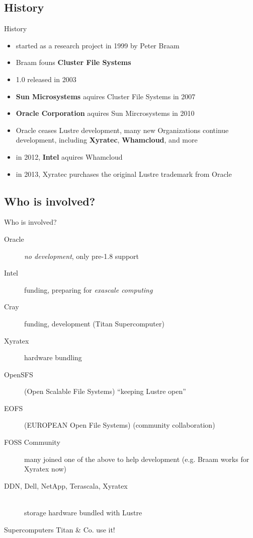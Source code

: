 \documentclass[compress,t,xcolor=dvipsnames]{beamer}
\begin{document}
\subsection{History}
\begin{frame}{History}
    \begin{itemize}
        \item started as a research project in 1999 by Peter Braam
        \item Braam founs \textbf{Cluster File Systems}
        \item 1.0 released in 2003
        \item \textbf{Sun Microsystems} aquires Cluster File Systems in 2007
        \item \textbf{Oracle Corporation} aquires Sun Mircrosystems in 2010
        \item Oracle ceases Lustre development, many new Organizations continue
            development, including \textbf{Xyratec},  \textbf{Whamcloud}, and
            more
        \item in 2012, \textbf{Intel} aquires Whamcloud
        \item in 2013, Xyratec purchases the original Lustre trademark from Oracle
    \end{itemize}
\end{frame}

\subsection{Who is involved?}
\begin{frame}{Who is involved?}
    \begin{description}
        \item[Oracle] \emph{no development}, only pre-1.8 support
        \item[Intel] funding, preparing for \emph{exascale computing}
        \item[Cray] funding, development (Titan Supercomputer)
        \item[Xyratex] hardware bundling
        \item[OpenSFS] (Open Scalable File Systems) ``keeping Lustre open''
        \item[EOFS] (EUROPEAN Open File Systems) (community collaboration)
        \item[FOSS Community] many joined one of the above to help development
            (e.g. Braam works for Xyratex now)
        \item[DDN, Dell, NetApp, Terascala, Xyratex]\hfill \\
            storage hardware bundled with Lustre
    \end{description}
\end{frame}
\begin{frame}{Supercomputers}
    Titan \& Co. use it!
\end{frame}
\end{document}
